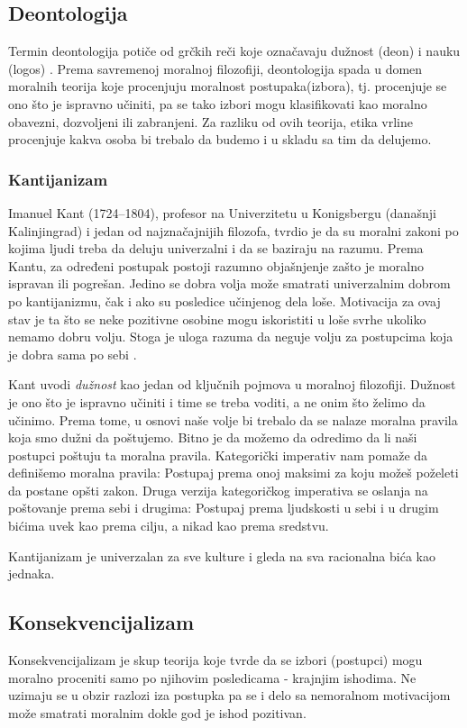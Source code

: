 \documentclass[a4paper]{article}
\begin{document}
\subsection{Deontologija}

Termin deontologija potiče od grčkih reči koje označavaju dužnost (deon) i nauku (logos) \cite{stanford}. Prema savremenoj moralnoj filozofiji, deontologija spada u domen moralnih teorija koje procenjuju moralnost postupaka(izbora), tj. procenjuje se ono što je ispravno učiniti, pa se tako izbori mogu klasifikovati kao moralno obavezni, dozvoljeni ili zabranjeni. Za razliku od ovih teorija, etika vrline procenjuje kakva osoba bi trebalo da budemo i u skladu sa tim da delujemo.

\subsubsection{Kantijanizam}

Imanuel Kant (1724–1804), profesor na Univerzitetu u Konigsbergu (današnji Kalinjingrad) i jedan od najznačajnijih filozofa, tvrdio je da su moralni zakoni po kojima ljudi treba da deluju univerzalni i da se baziraju na razumu. 
Prema Kantu, za određeni postupak postoji razumno objašnjenje zašto je moralno ispravan ili pogrešan.
Jedino se dobra volja može smatrati univerzalnim dobrom po kantijanizmu, čak i ako su posledice učinjenog dela loše.
Motivacija za ovaj stav je ta što se neke pozitivne osobine mogu iskoristiti u loše svrhe ukoliko nemamo dobru volju.
Stoga je uloga razuma da neguje volju za postupcima koja je dobra sama po sebi \cite{kant-iep}.

Kant uvodi \textit{dužnost} kao jedan od ključnih pojmova u moralnoj filozofiji. Dužnost je ono što je ispravno učiniti i time se treba voditi, a ne onim što želimo da učinimo.
Prema tome, u osnovi naše volje bi trebalo da se nalaze moralna pravila koja smo dužni da poštujemo. Bitno je da možemo da odredimo da li naši postupci poštuju ta moralna pravila.
Kategorički imperativ nam pomaže da definišemo moralna pravila: Postupaj prema onoj maksimi za koju možeš poželeti da postane opšti zakon.
Druga verzija kategoričkog imperativa se oslanja na poštovanje prema sebi i drugima: Postupaj prema ljudskosti u sebi i u drugim bićima uvek kao prema cilju, a nikad kao prema sredstvu.

Kantijanizam je univerzalan za sve kulture i gleda na sva racionalna bića kao jednaka.

\subsection{Konsekvencijalizam}
Konsekvencijalizam je skup teorija koje tvrde da se izbori (postupci) mogu moralno proceniti samo po njihovim posledicama - krajnjim ishodima. Ne uzimaju se u obzir razlozi iza postupka pa se i delo sa nemoralnom motivacijom može smatrati moralnim dokle god je ishod pozitivan. 
\end{document}
